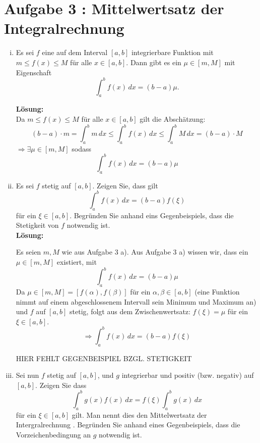 \documentclass[11pt,a4paper,ngerman]{article}
\begin{document}
\section*{Aufgabe 3 : \mdseries Mittelwertsatz der Integralrechnung}

\begin{enumerate}[i)]
    \item Es sei $f$ eine auf dem Interval $[a,b]$ integrierbare Funktion mit $m \leq f(x) \leq M$ für alle $x\in[a,b]$. Dann gibt es ein $\mu \in [m,M]$ mit Eigenschaft
$$
    \int_{a}^{b} f(x) \, dx = (b - a) \mu.
$$

\textbf{Lösung:}\\
Da $m \leq f(x) \leq M$ für alle $x\in[a,b]$ gilt die Abschätzung:
$$
    (b-a)\cdot m = \int_{a}^{b} m \, dx \leq \int_{a}^{b} f(x) \, dx \leq \int_{a}^{b} M \, dx = (b-a) \cdot M
$$
$\Rightarrow \exists \mu \in \left[m,M\right]$ sodass
$$
    \int_{a}^{b} f(x) \, dx = (b - a) \mu
$$

    \item Es sei $f$ stetig auf $[a,b]$. Zeigen Sie, dass gilt 
$$
    \int_{a}^{b} f(x)\, dx = (b-a) f(\xi)
$$
für ein $\xi\in [a,b]$. Begründen Sie anhand eins Gegenbeispiels, dass die Stetigkeit von $f$ notwendig ist.\\

\textbf{Lösung:}

Es seien $m,M$ wie aus Aufgabe 3 a). Aus Aufgabe 3 a) wissen wir, dass ein $\mu \in \left[m,M\right]$ existiert, mit
$$
    \int_{a}^{b} f(x) \, dx = (b - a) \mu
$$
Da $\mu \in \left[m,M\right] = \left[f(\alpha),f(\beta)\right]$ für ein $\alpha,\beta \in [a,b]$ (eine Funktion nimmt auf einem abgeschlossenem Intervall sein Minimum und Maximum an) und $f$ auf $\left[a,b\right]$ stetig, folgt aus dem Zwischenwertsatz: $f(\xi) = \mu$ für ein $\xi \in \left[a,b\right]$.
$$
    \Rightarrow \int_{a}^{b} f(x)\, dx = (b-a) f(\xi)
$$

HIER FEHLT GEGENBEISPIEL BZGL. STETIGKEIT

    \item Sei nun $f$ stetig auf $[a,b]$, und $g$ integrierbar und positiv (bzw. negativ) auf $[a,b]$. Zeigen Sie dass 
$$
    \int_{a}^{b} g(x)f(x)\, dx = f(\xi) \int_{a}^{b} g(x) \, dx
$$ 
für ein $\xi \in [a,b]$ gilt. Man nennt dies den Mittelwertsatz der Intergralrechnung   . Begründen Sie anhand eines Gegenbeispiels, dass die Vorzeichenbedingung an $g$ notwendig ist. 
\end{enumerate}

\end{document}
